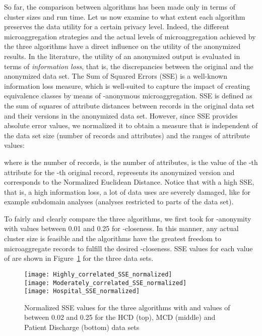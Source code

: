 \documentclass[10pt,journal,compsoc]{IEEEtran}
\theoremstyle{definition}
\theoremstyle{plain}
\begin{document}
So far, the comparison between algorithms 
has been made only in terms of cluster sizes and run time.
Let us now examine to what extent each algorithm preserves 
the data utility for a certain privacy level.
Indeed, the different microaggregation strategies
and the actual levels of microaggregation achieved by the three algorithms
have a direct influence on the utility of the anonymized results.
In the literature, the utility of an anonymized output is evaluated in terms of \textit{information loss}, that is, 
the discrepancies between the original and the anonymized data set.  
The Sum of Squared Errors (SSE) is a well-known information loss measure, 
which is well-suited to capture the impact of creating
equivalence classes by means of -anonymous microaggregation.
SSE is defined as 
the sum of squares of attribute distances between records
in the original data set  and their versions in the anonymized data set.
However, since SSE provides absolute error values, we 
normalized it to obtain a measure that is independent of
the data set size 
(number of records and attributes) and the ranges of attribute values:



where  is the number of records,  is the number of attributes,
  is the value of the -th attribute
for the -th original record,  represents its 
anonymized version and
 corresponds to the Normalized Euclidean Distance.
Notice that with a high SSE, that is, a high information loss, 
a lot of data uses are severely damaged, like
for example subdomain analyses (analyses restricted to parts of the data set).   

To fairly and clearly compare the three algorithms, we first took  for -anonymity
with  values between 0.01 and 0.25 for -closeness. 
In this manner, any actual cluster size  is feasible 
and the algorithms have the
greatest freedom to microaggregate records to fulfill the desired -closeness.
SSE values for each value of  are shown in Figure~\ref{fig:SSE} for the three data sets. 

\begin{figure}[!t]
\begin{centering}
	\texttt{[image: Highly\_correlated\_SSE\_normalized]}\\
	\vspace{0.2cm}	
\texttt{[image: Moderately\_correlated\_SSE\_normalized]}\\
	\vspace{0.2cm}
	\texttt{[image: Hospital\_SSE\_normalized]}\\
	\vspace{0.2cm}
\par\end{centering}
\protect\caption{Normalized SSE values for the three algorithms with  
and values of  between 0.02 and 0.25 for the HCD (top), MCD (middle) and 
Patient Discharge (bottom) data sets\label{fig:SSE}}
	\end{figure}
\end{document}
